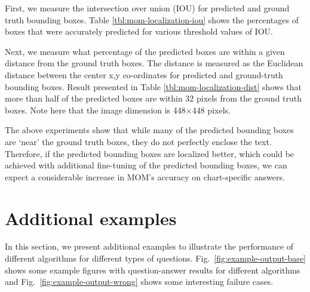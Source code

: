 \documentclass[10pt,twocolumn,letterpaper]{article}
\begin{document}
\begin{appendices}
First, we measure the intersection over union (IOU) for predicted and ground truth bounding boxes. Table \ref{tbl:mom-localization-iou} shows the percentages of boxes that were accurately predicted for various threshold values of IOU.

Next, we measure what percentage of the predicted boxes are within a given distance from the ground truth boxes. The distance is measured as the Euclidean distance between the center x,y co-ordinates for predicted and ground-truth bounding boxes. Result presented in Table \ref{tbl:mom-localization-dist} shows that more than half of the predicted boxes are within 32 pixels from the ground truth boxes. Note here that the image dimension is 448$\times$448 pixels.

The above experiments show that while many of the predicted bounding boxes are `near' the ground truth boxes, they do not perfectly enclose the text. Therefore, if the predicted bounding boxes are localized better, which could be achieved with additional fine-tuning of the predicted bounding boxes, we can expect a considerable increase in MOM's accuracy on chart-specific answers.

\section{Additional examples}

In this section, we present additional examples to illustrate the performance of different algorithms for different types of questions. Fig.~\ref{fig:example-output-base} shows some example figures with question-answer results for different algorithms and Fig.~\ref{fig:example-output-wrong} shows some interesting failure cases.


\end{appendices}
\end{document}
